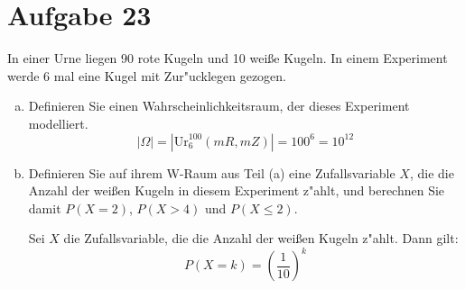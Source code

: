 \section{Aufgabe 23}
\setcounter{section}{23}

In einer Urne liegen 90 rote Kugeln und 10 wei{\ss}e Kugeln. In einem
Experiment werde 6 mal eine Kugel mit Zur"ucklegen gezogen.

\begin{enumerate}[(a)]
    \item Definieren Sie einen Wahrscheinlichkeitsraum, der dieses Experiment modelliert.
        \begin{equation*}
            |\Omega| = |\text{Ur}_6^{100}(mR, mZ)| = 100^6 = 10^{12}
        \end{equation*}
    \item Definieren Sie auf ihrem W-Raum aus Teil (a) eine
        Zufallsvariable $X$, die die Anzahl der wei{\ss}en Kugeln in diesem
        Experiment z"ahlt, und berechnen Sie damit $P(X = 2)$, $P(X > 4)$ und
        $P(X \leq 2)$.

        Sei $X$ die Zufallsvariable, die die Anzahl der wei{\ss}en Kugeln z"ahlt. Dann gilt:
        \begin{equation*}
            P(X = k) = \left(\dfrac{1}{10}\right)^k
        \end{equation*}
\end{enumerate}
